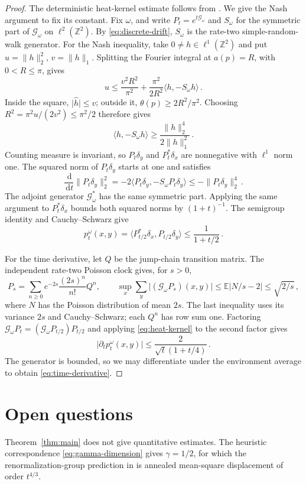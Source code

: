 \documentclass[11pt]{amsart}
\theoremstyle{plain}
\theoremstyle{definition}
\newcommand{\Z}{\mathbb Z}
\newcommand{\E}{\mathbb E}
\newcommand{\1}{\mathbf 1}
\newcommand{\ip}[2]{\langle #1,#2\rangle}
\newcommand{\norm}[1]{\lVert #1\rVert}
\newcommand{\abs}[1]{\lvert #1\rvert}
\newcommand{\dd}{\,\mathrm d}
\begin{document}
\begin{proof}
The deterministic heat-kernel estimate follows from
\citet*[Proposition~3, (82), Lemma~5, and Remarks~\textup{(1), (3)}
after its proof]{KT17}.  We give the Nash argument to fix its constant.
Fix $\omega$, and write $P_t=e^{t\mathcal G_\omega}$ and $S_\omega$ for
the symmetric part of $\mathcal G_\omega$ on $\ell^2(\Z^2)$.
By \eqref{eq:discrete-drift}, $S_\omega$ is the rate-two simple-random-walk
generator.  For the Nash inequality, take $0\ne h\in\ell^1(\Z^2)$ and put
$u=\norm h_2^2$, $v=\norm h_1$.
Splitting the Fourier integral at $a(p)=R$, with $0<R\leq\pi$, gives
\[
  u\leq\frac{v^2R^2}{\pi^2}
    +\frac{\pi^2}{2R^2}\ip h{-S_\omega h}\, .
\]
Inside the square, $\abs{\widehat h}\leq v$; outside it,
$\theta(p)\geq2R^2/\pi^2$.  Choosing
$R^2=\pi^2u/(2v^2)\leq\pi^2/2$ therefore gives
\[
  \ip h{-S_\omega h}\geq\frac{\norm h_2^4}{2\norm h_1^2}\, .
\]
Counting measure is invariant, so $P_t\delta_y$ and $P_t^*\delta_x$ are
nonnegative with $\ell^1$ norm one.  The squared norm of $P_t\delta_y$
starts at one and satisfies
\[
  \frac{\dd}{\dd t}\norm{P_t\delta_y}_2^2
  =-2\ip{P_t\delta_y}{-S_\omega P_t\delta_y}
  \leq-\norm{P_t\delta_y}_2^4\, .
\]
The adjoint generator $\mathcal G_\omega^*$ has the same symmetric part.
Applying the same argument to $P_t^*\delta_x$ bounds both squared norms
by $(1+t)^{-1}$.  The semigroup identity and Cauchy--Schwarz give
\[
  p_t^\omega(x,y)
  =\ip{P_{t/2}^*\delta_x}{P_{t/2}\delta_y}
  \leq\frac1{1+t/2}\, .
\]

For the time derivative, let $Q$ be the jump-chain transition matrix.
The independent rate-two Poisson clock gives, for $s>0$,
\[
  P_s=\sum_{n\geq0}e^{-2s}\frac{(2s)^n}{n!}Q^n,\qquad
  \sup_x\sum_y\abs{(\mathcal G_\omega P_s)(x,y)}
  \leq\E\abs{N/s-2}\leq\sqrt{2/s}\, ,
\]
where $N$ has the Poisson distribution of mean $2s$.
The last inequality uses its variance $2s$ and Cauchy--Schwarz;
each $Q^n$ has row sum one.  Factoring
$\mathcal G_\omega P_t=(\mathcal G_\omega P_{t/2})P_{t/2}$ and applying
\eqref{eq:heat-kernel} to the second factor gives
\[
  \abs{\partial_t p_t^\omega(x,y)}
  \leq\frac2{\sqrt t(1+t/4)}\, .
\]
The generator is bounded, so we may differentiate under the environment
average to obtain \eqref{eq:time-derivative}.
\end{proof}

\section{Open questions}\label{sec:open}
Theorem~\ref{thm:main} does not give quantitative estimates.
The heuristic correspondence \eqref{eq:gamma-dimension} gives $\gamma=1/2$,
for which the renormalization-group prediction in
\citet*[(1.3)]{ABK26} is annealed mean-square displacement of order $t^{4/3}$.
\end{document}
